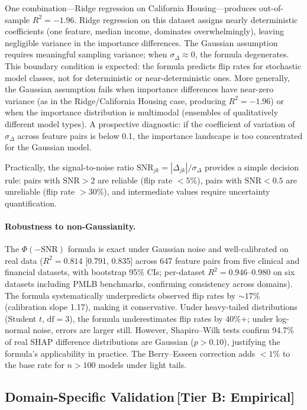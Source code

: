 \documentclass[11pt,a4paper]{article}
\begin{document}
One combination---Ridge regression on California Housing---produces out-of-sample $R^2 = -1.96$.  Ridge regression on this dataset assigns nearly deterministic coefficients (one feature, median income, dominates overwhelmingly), leaving negligible variance in the importance differences.  The Gaussian assumption requires meaningful sampling variance; when $\sigma_\Delta \approx 0$, the formula degenerates.  This boundary condition is expected: the formula predicts flip rates for stochastic model classes, not for deterministic or near-deterministic ones.
More generally, the Gaussian assumption fails when importance differences have near-zero variance (as in the Ridge/California Housing case, producing $R^2 = -1.96$) or when the importance distribution is multimodal (ensembles of qualitatively different model types).  A prospective diagnostic: if the coefficient of variation of $\sigma_\Delta$ across feature pairs is below 0.1, the importance landscape is too concentrated for the Gaussian model.

Practically, the signal-to-noise ratio $\text{SNR}_{jk} = |\Delta_{jk}|/\sigma_\Delta$ provides a simple decision rule: pairs with
$\text{SNR} > 2$ are reliable (flip rate $< 5\%$), pairs with
$\text{SNR} < 0.5$ are unreliable (flip rate $> 30\%$), and intermediate
values require uncertainty quantification.

\paragraph{Robustness to non-Gaussianity.}
The $\Phi(-\text{SNR})$ formula is exact under Gaussian noise and well-calibrated on real data ($R^2 = 0.814$ [0.791, 0.835] across 647 feature pairs from five clinical and financial datasets, with bootstrap 95\% CIs; per-dataset $R^2 = 0.946$--$0.980$ on six datasets including PMLB benchmarks, confirming consistency across domains). The formula systematically underpredicts observed flip rates by ${\sim}17\%$ (calibration slope 1.17), making it conservative. Under heavy-tailed distributions (Student $t$, $\text{df}=3$), the formula underestimates flip rates by 40\%+; under log-normal noise, errors are larger still. However, Shapiro--Wilk tests confirm 94.7\% of real SHAP difference distributions are Gaussian ($p > 0.10$), justifying the formula's applicability in practice. The Berry--Esseen correction adds $< 1\%$ to the base rate for $n > 100$ models under light tails.

\subsection{Domain-Specific Validation\,\textnormal{\normalsize[Tier B: Empirical]}}
\label{sec:domain-validation}
\end{document}

